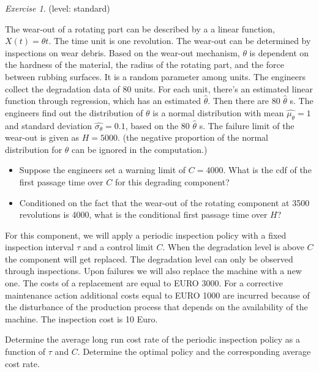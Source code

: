 \documentclass[10pt,a4paper]{article}
\theoremstyle{remark}
\newtheorem{exercise}{Exercise}
\begin{document}
\begin{exercise} \label{exercise:Degradation1}
(level: standard)

The wear-out of a rotating part can be described by a a linear function, $X(t)=\theta t$. The time unit is one revolution. The wear-out can be determined by inspections on wear debris. Based on the wear-out mechanism, $\theta$ is dependent on the hardness of the material, the radius of the rotating part, and the force between rubbing surfaces. It is a random parameter among units. The engineers collect the degradation data of 80 units. For each unit, there's an estimated linear function through regression, which has an estimated $\hat{\theta}$. Then there are 80 $\hat{\theta}$ s. The engineers find out the distribution of $\theta$ is a normal distribution with mean $\hat{\mu_{\theta}}= 1$ and standard deviation $\hat{\sigma_{\theta}}= 0.1$, based on the 80 $\hat{\theta}$ s. The failure limit of the wear-out is given as $H=5000$. (the negative proportion of the normal distribution for $\theta$ can be ignored in the computation.)  

\begin{itemize}
 \item Suppose the engineers set a warning limit of $C=4000$. What is the cdf of the first passage time over $C$ for this degrading component?
 \item Conditioned on the fact that the wear-out of the rotating component at 3500 revolutions is 4000, what is the conditional first passage time over $H$?   
 \end{itemize} 
For this component, we will apply a periodic inspection policy with a fixed inspection interval $\tau$ and a control limit $C$. When the degradation level is above $C$ the component will get replaced. The degradation level can only be observed through inspections. Upon failures we will also replace the machine with a new one. The costs of a replacement are equal to EURO 3000. For a corrective maintenance action additional costs equal to EURO 1000 are incurred because of the disturbance of the production process that depends on the availability of the machine. The inspection cost is 10 Euro.

Determine the average long run cost rate of the periodic inspection policy as a function of $\tau$ and $C$. Determine the optimal policy and the corresponding average cost rate.
\end{exercise}
\end{document}
